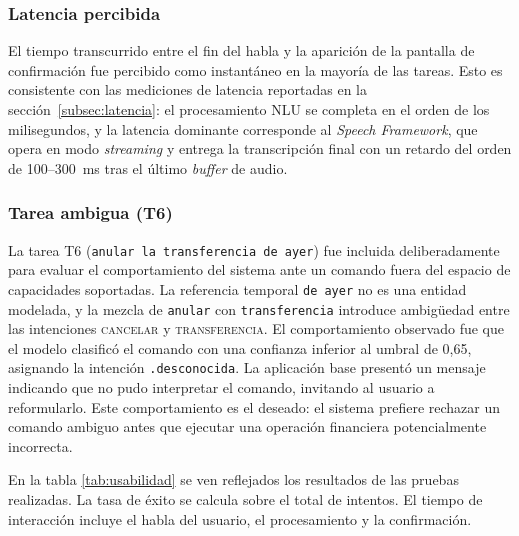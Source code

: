 \subsubsection*{Latencia percibida}

El tiempo transcurrido entre el fin del habla y la aparición de la pantalla de confirmación fue percibido como instantáneo en la mayoría de las tareas.
Esto es consistente con las mediciones de latencia reportadas en la sección~\ref{subsec:latencia}: el procesamiento NLU se completa en el orden de
los milisegundos, y la latencia dominante corresponde al \textit{Speech Framework}, que opera en modo \textit{streaming} y entrega la transcripción
final con un retardo del orden de 100--300~ms tras el último \textit{buffer} de audio.

\subsubsection*{Tarea ambigua (T6)}

La tarea T6 (\texttt{anular la transferencia de ayer}) fue incluida deliberadamente para evaluar el comportamiento del sistema ante un comando fuera del espacio de capacidades soportadas. La referencia temporal \texttt{de ayer} no es una entidad modelada, y la mezcla de \texttt{anular} con \texttt{transferencia} introduce ambigüedad entre las intenciones \textsc{cancelar} y \textsc{transferencia}. El comportamiento observado fue que el modelo clasificó el comando con una confianza inferior al umbral de 0,65, asignando la intención \texttt{.desconocida}. La aplicación base presentó un mensaje indicando que no pudo interpretar el comando, invitando al usuario a reformularlo. Este comportamiento es el deseado: el sistema prefiere rechazar un comando ambiguo
antes que ejecutar una operación financiera potencialmente incorrecta.

En la tabla \ref{tab:usabilidad} se ven reflejados los resultados de las pruebas realizadas. La tasa de éxito se calcula sobre el total de intentos. El tiempo de interacción incluye el habla del usuario, el procesamiento y la confirmación.

